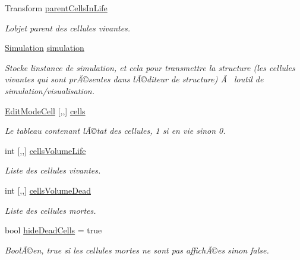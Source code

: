 \begin{DoxyCompactItemize}
Transform \mbox{\hyperlink{class_edit_mode_manager_a73637bcfc94b5701b5bab079a93aaaad}{parent\+Cells\+In\+Life}}
\begin{DoxyCompactList}\small\item\em L\textquotesingle{}objet parent des cellules vivantes. \end{DoxyCompactList}\item 
\mbox{\hyperlink{class_simulation}{Simulation}} \mbox{\hyperlink{class_edit_mode_manager_a1fd101cae685f8113863a24df8b9ee8f}{simulation}}
\begin{DoxyCompactList}\small\item\em Stocke l\textquotesingle{}instance de simulation, et cela pour transmettre la structure (les cellules vivantes qui sont prÃ©sentes dans l\textquotesingle{}Ã©diteur de structure) Ã  l\textquotesingle{}outil de simulation/visualisation. \end{DoxyCompactList}\item 
\mbox{\hyperlink{class_edit_mode_cell}{Edit\+Mode\+Cell}} \mbox{[},,\mbox{]} \mbox{\hyperlink{class_edit_mode_manager_a7dedb1b0edf13150eb522730203f773e}{cells}}
\begin{DoxyCompactList}\small\item\em Le tableau contenant l\textquotesingle{}Ã©tat des cellules, 1 si en vie sinon 0. \end{DoxyCompactList}\item 
int \mbox{[},,\mbox{]} \mbox{\hyperlink{class_edit_mode_manager_ae9b25aaa4594dd5296b2e8190b7ff303}{cells\+Volume\+Life}}
\begin{DoxyCompactList}\small\item\em Liste des cellules vivantes. \end{DoxyCompactList}\item 
int \mbox{[},,\mbox{]} \mbox{\hyperlink{class_edit_mode_manager_a2f9d02aaf0d440c6ab0f9b73e3fec5e6}{cells\+Volume\+Dead}}
\begin{DoxyCompactList}\small\item\em Liste des cellules mortes. \end{DoxyCompactList}\item 
bool \mbox{\hyperlink{class_edit_mode_manager_a2ad2ba7ae4c1faa2444b397f587f8adf}{hide\+Dead\+Cells}} = true
\begin{DoxyCompactList}\small\item\em BoolÃ©en, true si les cellules mortes ne sont pas affichÃ©es sinon false. \end{DoxyCompactList}\item 

\end{DoxyCompactItemize}
